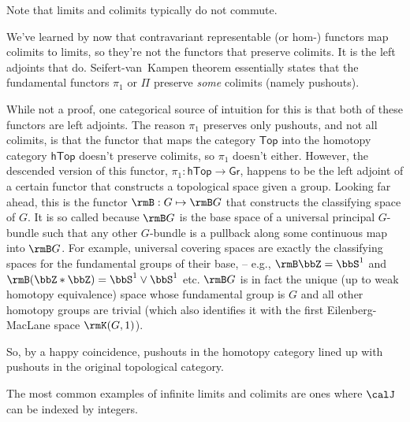Note that limits and colimits typically do not commute.

\begin{example}
    We've learned by now that contravariant representable (or hom-) functors map colimits to limits, so they're not the functors that preserve colimits. It is the left adjoints that do. Seifert-van~Kampen theorem essentially states that the fundamental functors $\pi_1$ or $\Pi$ preserve \emph{some} colimits (namely pushouts). 
    
    While not a proof, one categorical source of intuition for this is that both of these functors are left adjoints. The reason $\pi_1$ preserves only pushouts, and not all colimits, is that the functor that maps the category $\mathsf{Top}$ into the homotopy category $\mathsf{hTop}$ doesn't preserve colimits, so $\pi_1$ doesn't either. However, the descended version of this functor, $\pi_1:\mathsf{hTop}\to \mathsf{Gr}$, happens to be the left adjoint of a certain functor that constructs a topological space given a group. Looking far ahead, this is the functor $\rmB:G\mapsto \rmB G$ that constructs the classifying space of $G$. It is so called because $\rmB G$ is the base space of a universal principal $G$-bundle such that any other $G$-bundle is a pullback along some continuous map into $\rmB G$. For example, universal covering spaces are exactly the classifying spaces for the fundamental groups of their base, -- e.g., $\rmB\bbZ=\bbS^1$ and $\rmB(\bbZ\ast \bbZ)=\bbS^1\vee \bbS^1$ etc. $\rmB G$ is in fact the unique (up to weak homotopy equivalence) space whose fundamental group is $G$ and all other homotopy groups are trivial (which also identifies it with the first  Eilenberg-MacLane space $\rmK(G,1)$).

    So, by a happy coincidence, pushouts in the homotopy category lined up with pushouts in the original topological category.
\end{example}

The most common examples of infinite limits and colimits are ones where $\calJ $ can be indexed by integers.

